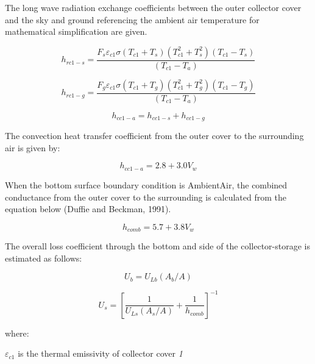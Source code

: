 The long wave radiation exchange coefficients between the outer collector cover and the sky and ground referencing the ambient air temperature for mathematical simplification are given.

\begin{equation}
{h_{rc1 - s}} = \frac{{{F_s}{\varepsilon_{c1}}\sigma \left( {{T_{c1}} + {T_s}} \right)\left( {T_{c1}^2 + T_s^2} \right)\left( {{T_{c1}} - {T_s}} \right)}}{{\left( {{T_{c1}} - {T_a}} \right)}}
\end{equation}

\begin{equation}
{h_{rc1 - g}} = \frac{{{F_g}{\varepsilon_{c1}}\sigma \left( {{T_{c1}} + {T_g}} \right)\left( {T_{c1}^2 + T_g^2} \right)\left( {{T_{c1}} - {T_g}} \right)}}{{\left( {{T_{c1}} - {T_a}} \right)}}
\end{equation}

\begin{equation}
{h_{cc1 - a}} = {h_{cc1 - s}} + {h_{cc1 - g}}
\end{equation}

The convection heat transfer coefficient from the outer cover to the surrounding air is given by:

\begin{equation}
{h_{cc1 - a}} = 2.8 + 3.0{V_w}
\end{equation}

When the bottom surface boundary condition is AmbientAir, the combined conductance from the outer cover to the surrounding is calculated from the equation below (Duffie and Beckman, 1991).

\begin{equation}
{h_{comb}} = 5.7 + 3.8{V_w}
\end{equation}

The overall loss coefficient through the bottom and side of the collector-storage is estimated as follows:

\begin{equation}
{U_b} = {U_{Lb}}\left( {{A_b}/A} \right)
\end{equation}

\begin{equation}
{U_s} = {\left[ {\frac{1}{{{U_{Ls}}\left( {{A_s}/A} \right)}} + \frac{1}{{{h_{comb}}}}} \right]^{ - 1}}
\end{equation}

where:

\({\varepsilon}_{c1}\) is the thermal emissivity of collector cover \emph{1}

